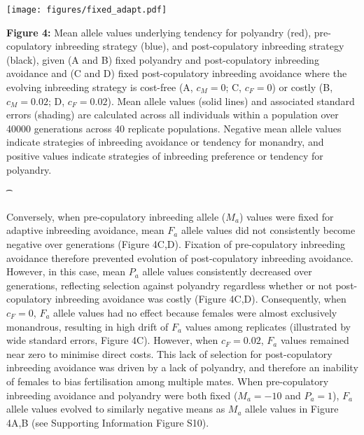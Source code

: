 \documentclass[10pt,letterpaper]{article}
\begin{document}
{\color{Gray}
\begin{adjustwidth}{-2.2in}{0in}
{%
   \texttt{[image: figures/fixed\_adapt.pdf]}%
}
{%
   \begin{justify}\vspace{0.25 mm} \textbf{Figure 4:} Mean allele values underlying tendency for polyandry (red), pre-copulatory inbreeding strategy (blue), and post-copulatory inbreeding strategy (black), given (A and B) fixed polyandry and post-copulatory inbreeding avoidance and (C and D) fixed post-copulatory inbreeding avoidance where the evolving inbreeding strategy is cost-free (A, $c_{M} = 0$; C, $c_{F} = 0$) or costly (B, $c_{M}=0.02$; D, $c_{F}=0.02$). Mean allele values (solid lines) and associated standard errors (shading) are calculated across all individuals within a population over 40000 generations across 40 replicate populations. Negative mean allele values indicate strategies of inbreeding avoidance or tendency for monandry, and positive values indicate strategies of inbreeding preference or tendency for polyandry. \end{justify}{\t}%
}
\end{adjustwidth}
}

Conversely, when pre-copulatory inbreeding allele ($M_{a}$) values were fixed for adaptive inbreeding avoidance, mean $F_{a}$ allele values did not consistently become negative over generations (Figure 4C,D). Fixation of pre-copulatory inbreeding avoidance therefore prevented evolution of post-copulatory inbreeding avoidance. However, in this case, mean $P_{a}$ allele values consistently decreased over generations, reflecting selection against polyandry regardless whether or not post-copulatory inbreeding avoidance was costly (Figure 4C,D). Consequently, when $c_{F}=0$, $F_{a}$ allele values had no effect because females were almost exclusively monandrous, resulting in high drift of $F_{a}$ values among replicates (illustrated by wide standard errors, Figure 4C). However, when $c_{F}=0.02$, $F_{a}$ values remained near zero to minimise direct costs. This lack of selection for post-copulatory inbreeding avoidance was driven by a lack of polyandry, and therefore an inability of females to bias fertilisation among multiple mates. When pre-copulatory inbreeding avoidance and polyandry were both fixed ($M_{a}=-10$ and $P_{a}=1$), $F_{a}$ allele values evolved to similarly negative means as $M_{a}$ allele values in Figure 4A,B (see Supporting Information Figure S10). 
\end{document}
